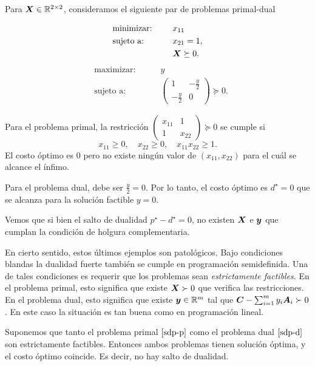 \begin{example}
Para $\bm{X} \in \mathbb{R}^{2 \times 2}$, consideramos el siguiente par de problemas primal-dual
\begin{multicols}{2}\noindent
\begin{alignat*}{2}
  & \text{minimizar: }  & \quad & x_{11}   \\
   & \text{sujeto a: } & \quad & x_{21} = 1, \\
   &&& \Xb \succeq 0.
\end{alignat*}
\begin{alignat*}{2}
  & \text{maximizar: }  & \quad & y   \\
   & \text{sujeto a: } & \quad & \begin{pmatrix}
 1 & -\frac{y}{2}  \\ -\frac{y}{2} & 0 \end{pmatrix} \succeq 0.
\end{alignat*}
\end{multicols}

Para el problema primal, la restricción 
$\begin{pmatrix} x_{11} & 1 \\ 1 & x_{22}\end{pmatrix} \succeq 0$ 
se cumple si 
$$x_{11} \ge 0, \quad x_{22} \ge 0, \quad x_{11}x_{22} \ge 1.$$ 
El costo óptimo es $0$ pero no existe ningún valor de $(x_{11}, x_{22})$ para el cuál se alcance el ínfimo.

Para el problema dual, debe ser $\frac{y}{2} = 0$. Por lo tanto, el costo óptimo es $d^\star = 0$ que se alcanza para la solución factible $y = 0$.

Vemos que si bien el salto de dualidad $p^\star - d^\star = 0$, no existen $\bm{X}$ e $\bm{y}$ que cumplan la condición de holgura complementaria.

\end{example}

En cierto sentido, estos últimos ejemplos son patológicos. Bajo condiciones blandas la dualidad fuerte también se cumple en programación semidefinida. Una de tales condiciones es requerir que los problemas sean \emph{estrictamente factibles}. En el problema primal, esto significa que existe $\bm{X} \succ 0$ que verifica las restricciones. En el problema dual, esto significa que existe $\bm{y} \in \mathbb{R}^m$ tal que $\bm{C} - \sum_{i=1}^m y_i \bm{A}_i \succ 0$. En este caso la situación es tan buena como en programación lineal.

\begin{theorem} Suponemos que tanto el problema primal $\eqref{sdp-p}$ como el problema dual $\eqref{sdp-d}$ son estrictamente factibles. Entonces ambos problemas tienen solución óptima, y el costo óptimo coincide. Es decir, no hay salto de dualidad.
\end{theorem}

